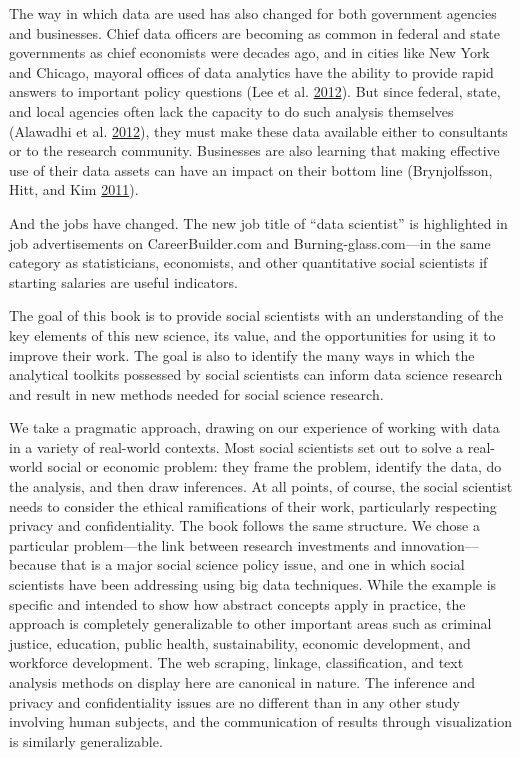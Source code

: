 \documentclass[]{krantz}
\begin{document}
The way in which data are used has also changed for both government
agencies and businesses. Chief data officers are becoming as common in
federal and state governments as chief economists were decades ago, and
in cities like New York and Chicago, mayoral offices of data analytics
have the ability to provide rapid answers to important policy questions
(Lee et al. \protect\hyperlink{ref-lee2012rise}{2012}). But since
federal, state, and local agencies often lack the capacity to do such
analysis themselves (Alawadhi et al.
\protect\hyperlink{ref-alawadhi2012building}{2012}), they must make
these data available either to consultants or to the research community.
Businesses are also learning that making effective use of their data
assets can have an impact on their bottom line (Brynjolfsson, Hitt, and
Kim \protect\hyperlink{ref-brynjolfsson2011strength}{2011}).

And the jobs have changed. The new job title of ``data scientist'' is
highlighted in job advertisements on CareerBuilder.com and
Burning-glass.com---in the same category as statisticians, economists,
and other quantitative social scientists if starting salaries are useful
indicators.

The goal of this book is to provide social scientists with an
understanding of the key elements of this new science, its value, and
the opportunities for using it to improve their work. The goal is also
to identify the many ways in which the analytical toolkits possessed by
social scientists can inform data science research and result in new
methods needed for social science research.

We take a pragmatic approach, drawing on our experience of working with
data in a variety of real-world contexts. Most social scientists set out
to solve a real-world social or economic problem: they frame the
problem, identify the data, do the analysis, and then draw inferences.
At all points, of course, the social scientist needs to consider the
ethical ramifications of their work, particularly respecting privacy and
confidentiality. The book follows the same structure. We chose a
particular problem---the link between research investments and
innovation---because that is a major social science policy issue, and
one in which social scientists have been addressing using big data
techniques. While the example is specific and intended to show how
abstract concepts apply in practice, the approach is completely
generalizable to other important areas such as criminal justice,
education, public health, sustainability, economic development, and
workforce development. The web scraping, linkage, classification, and
text analysis methods on display here are canonical in nature. The
inference and privacy and confidentiality issues are no different than
in any other study involving human subjects, and the communication of
results through visualization is similarly generalizable.
\end{document}
